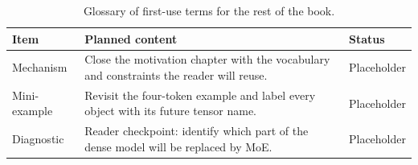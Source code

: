 \begin{table}[H]
\centering
\caption{Glossary of first-use terms for the rest of the book.}
\label{tab:ch01-chapter-summary-and-handoff}
\begin{tabularx}{\textwidth}{p{}X p{}}
\toprule
Item & Planned content & Status \\
\midrule
Mechanism & Close the motivation chapter with the vocabulary and constraints the reader will reuse. & Placeholder \\
Mini-example & Revisit the four-token example and label every object with its future tensor name. & Placeholder \\
Diagnostic & Reader checkpoint: identify which part of the dense model will be replaced by MoE. & Placeholder \\
\bottomrule
\end{tabularx}
\end{table}
